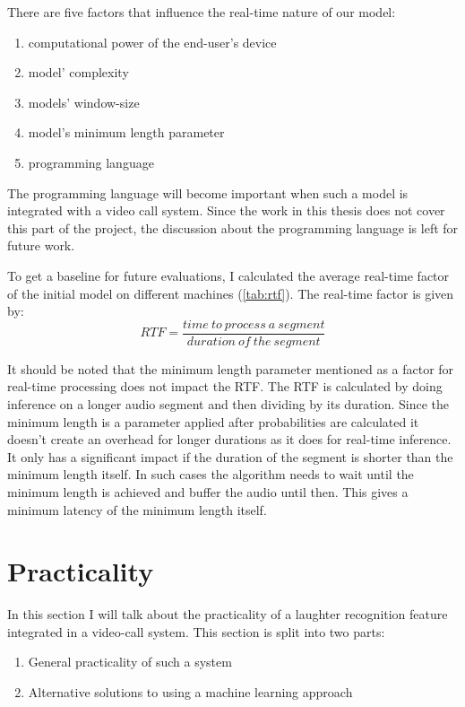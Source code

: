 \documentclass[bsc,frontabs,parskip,deptreport]{infthesis}
\begin{document}
There are five factors that influence the real-time nature of our model:
\begin{enumerate}
    \item computational power of the end-user's device
    \item model' complexity
    \item models' window-size
    \item model's minimum length parameter 
    \item programming language
\end{enumerate}

The programming language will become important when such a model is integrated with a video call system. Since the work in this thesis does not cover this part of the project, the discussion about the programming language is left for future work.

To get a baseline for future evaluations, I calculated the average real-time factor of the initial model on different machines (\autoref{tab:rtf}).
The real-time factor is given by: 
$$ RTF = \frac{time\ to\ process\ a\ segment}{duration\ of\ the\ segment} $$

It should be noted that the minimum length parameter mentioned as a factor for real-time processing does not impact the RTF. The RTF is calculated by doing inference on a longer audio segment and then dividing by its duration.
Since the minimum length is a parameter applied after probabilities are calculated it doesn't create an overhead for longer durations as it does for real-time inference.
It only has a significant impact if the duration of the segment is shorter than the minimum length itself. 
In such cases the algorithm needs to wait until the minimum length is achieved and buffer the audio until then. This gives a minimum latency of the minimum length itself.






\chapter{Practicality}
In this section I will talk about the practicality of a laughter recognition feature integrated in a video-call system. 
This section is split into two parts: 
\begin{enumerate}
    \item General practicality of such a system
    \item Alternative solutions to using a machine learning approach 
\end{enumerate}
\end{document}
